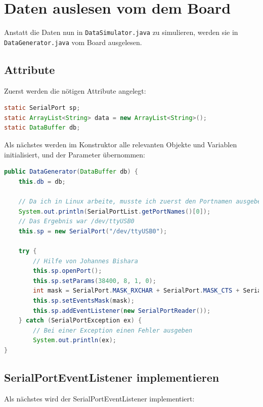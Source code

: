\section{Daten auslesen vom dem Board}
Anstatt die Daten nun in \verb|DataSimulator.java| zu simulieren, werden sie in \verb|DataGenerator.java| vom  Board ausgelesen.

\subsection{Attribute}
Zuerst werden die nötigen Attribute angelegt:
\begin{lstlisting}[language=Java]
static SerialPort sp;
static ArrayList<String> data = new ArrayList<String>();
static DataBuffer db;
\end{lstlisting}

Als nächstes werden im Konstruktor alle relevanten Objekte und Variablen initialisiert, und der Parameter übernommen:

\begin{lstlisting}[language=Java]
public DataGenerator(DataBuffer db) {
	this.db = db;
	
	// Da ich in Linux arbeite, musste ich zuerst den Portnamen ausgeben, damit ich erkenne wie dieser heisst
	System.out.println(SerialPortList.getPortNames()[0]);
	// Das Ergebnis war /dev/ttyUSB0
	this.sp = new SerialPort("/dev/ttyUSB0");
	
	try {
		// Hilfe von Johannes Bishara
		this.sp.openPort();
		this.sp.setParams(38400, 8, 1, 0);
		int mask = SerialPort.MASK_RXCHAR + SerialPort.MASK_CTS + SerialPort.MASK_DSR;
		this.sp.setEventsMask(mask);
		this.sp.addEventListener(new SerialPortReader());
	} catch (SerialPortException ex) {
		// Bei einer Exception einen Fehler ausgeben
		System.out.println(ex);
}
\end{lstlisting}

\subsection{SerialPortEventListener implementieren}
Als nächstes wird der SerialPortEventListener implementiert:

